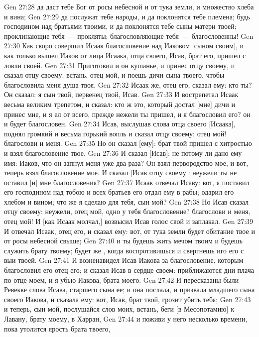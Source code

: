 \vs Gen 27:28 да даст тебе Бог от росы небесной и от тука земли, и множество хлеба и вина;
\vs Gen 27:29 да послужат тебе народы, и да поклонятся тебе племена; будь господином над братьями твоими, и да поклонятся тебе сыны матери твоей; проклинающие тебя~--- прокляты; благословляющие тебя~--- благословенны!
\rsbpar\vs Gen 27:30 Как скоро совершил Исаак благословение над Иаковом [сыном своим], и как только вышел Иаков от лица Исаака, отца своего, Исав, брат его, пришел с ловли своей.
\vs Gen 27:31 Приготовил и он кушанье, и принес отцу своему, и сказал отцу своему: встань, отец мой, и поешь дичи сына твоего, чтобы благословила меня душа твоя.
\vs Gen 27:32 Исаак же, отец его, сказал ему: кто ты? Он сказал: я сын твой, первенец твой, Исав.
\vs Gen 27:33 И вострепетал Исаак весьма великим трепетом, и сказал: кто ж это, который достал [мне] дичи и принес мне, и я ел от всего, прежде нежели ты пришел, и я благословил его? он и будет благословен.
\vs Gen 27:34 Исав, выслушав слова отца своего [Исаака], поднял громкий и весьма горький вопль и сказал отцу своему: отец мой! благослови и меня.
\vs Gen 27:35 Но он сказал [ему]: брат твой пришел с хитростью и взял благословение твое.
\vs Gen 27:36 И сказал [Исав]: не потому ли дано ему имя: Иаков, что он запнул меня уже два раза? Он взял первородство мое, и вот, теперь взял благословение мое. И  сказал [Исав отцу своему]: неужели ты не оставил [и] мне благословения?
\vs Gen 27:37 Исаак отвечал Исаву: вот, я поставил его господином над тобою и всех братьев его отдал ему в рабы; одарил его хлебом и вином; что же я сделаю для тебя, сын мой?
\vs Gen 27:38 Но Исав сказал отцу своему: неужели, отец мой, одно у тебя благословение? благослови и меня, отец мой! И [как Исаак молчал,] возвысил Исав голос свой и заплакал.
\vs Gen 27:39 И отвечал Исаак, отец его, и сказал ему: вот, от тука земли будет обитание твое и от росы небесной свыше;
\vs Gen 27:40 и ты будешь жить мечом твоим и будешь служить брату твоему; будет же , когда воспротивишься и свергнешь иго его с выи твоей.
\vs Gen 27:41 И возненавидел Исав Иакова за благословение, которым благословил его отец его; и сказал Исав в сердце своем: приближаются дни плача по отце моем, и я убью Иакова, брата моего.
\vs Gen 27:42 И пересказаны были Ревекке слова Исава, старшего сына ее; и она послала, и призвала младшего сына своего Иакова, и сказала ему: вот, Исав, брат твой, грозит убить тебя;
\vs Gen 27:43 и теперь, сын мой, послушайся слов моих, встань, беги [в Месопотамию] к Лавану, брату моему, в Харран,
\vs Gen 27:44 и поживи у него несколько времени, пока утолится ярость брата твоего,
